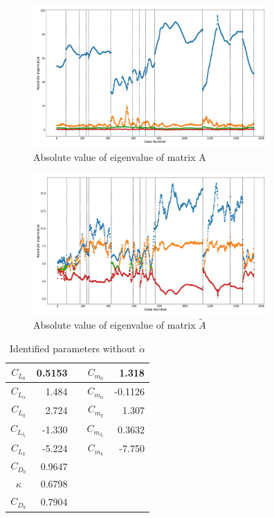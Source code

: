 \begin{figure}[H]
	\centering
	\includegraphics[clip,width=9.0cm,bb=0 0 1440 864]{./z_figure_files/chapter5/eigen_bad.jpeg}
	\caption{Absolute value of eigenvalue of matrix A}
	\label{fig:eigen}
\end{figure}

\begin{figure}[H]
	\centering
	\includegraphics[clip,width=9.0cm,bb=0 0 1440 864]{./z_figure_files/chapter5/eigen_good.jpeg}
	\caption{Absolute value of eigenvalue of matrix $\tilde{A}$}
	\label{fig:eigen_nondalpha}
\end{figure}

\begin{table} [htbp]
  \begin{center}
    \caption{Identified parameters without $\dot{\alpha}$}
    \label{tb:si_result_nondalpha}
    \begin{tabular}{|c||r|cc||r|} \hline
      $C_{L_0}$ & 0.5153 & & $C_{m_0}$ & 1.318 \\ \hline
      $C_{L_\alpha}$ & 1.484 & & $C_{m_\alpha}$ & -0.1126 \\ \hline
      $C_{L_q}$ & 2.724 & & $C_{m_q}$ & 1.307\\ \hline
      $C_{L_{\delta_e}}$ & -1.330 & & $C_{m_{\delta_e}}$ & 0.3632 \\ \hline
      $C_{L_k}$ & -5.224 & & $C_{m_k}$ & -7.750 \\ \hline
      $C_{D_0}$ & 0.9647 &&&\\ \hline
      $\kappa$ & 0.6798 &&&\\ \hline
      $C_{D_k}$ & 0.7904 &&&\\ \hline
    \end{tabular}
  \end{center}
\end{table}

